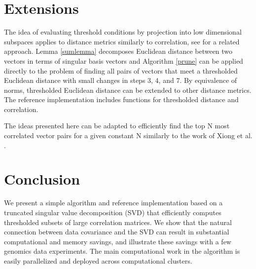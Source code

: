\documentclass[article]{jss}
\numberwithin{algorithmctr}{section}
\begin{document}
\section{Extensions}\label{extensions}

The idea of evaluating threshold conditions by projection into low dimensional
subspaces applies to distance metrics similarly to correlation, see
\citep{svd-similarity} for a related approach. Lemma \ref{sumlemma} decomposes
Euclidean distance between two vectors in terms of singular basis vectors and
Algorithm \ref{prune} can be applied directly to the problem of finding all
pairs of vectors that meet a thresholded Euclidean distance with small changes
in steps 3, 4, and 7.  By equivalence of norms, thresholded Euclidean distance
can be extended to other distance metrics. The reference 
implementation \citep{sup} includes functions for thresholded distance and
correlation.

The ideas presented here can be adapted to efficiently find the top N most
correlated vector pairs for a given constant N similarly to the work of
Xiong et al. \citep{prune2}.

\section{Conclusion}\label{conclusion}

We present a simple algorithm and reference  implementation based
on a truncated singular value decomposition (SVD) that efficiently computes
thresholded subsets of large correlation  matrices.  We show that the natural
connection between data covariance and the SVD can result in substantial
computational and memory savings, and illustrate these savings with a few
genomics data experiments.  The main computational work in the algorithm is
easily parallelized and deployed across computational clusters.


{}
\end{document}
